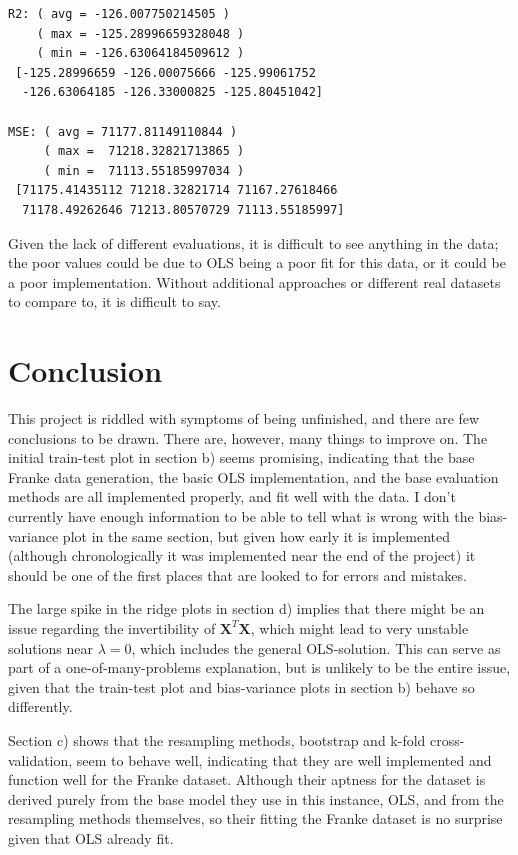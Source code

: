 \documentclass[a4paper, UKenglish]{article}
\newcommand{\0}{\mathbf{0}}
\newcommand{\1}{\mathbf{1}}
\begin{document}
\begin{lstlisting}
R2: ( avg = -126.007750214505 )
    ( max = -125.28996659328048 )
    ( min = -126.63064184509612 )
 [-125.28996659 -126.00075666 -125.99061752 
  -126.63064185 -126.33000825 -125.80451042]

MSE: ( avg = 71177.81149110844 )
     ( max =  71218.32821713865 )
     ( min =  71113.55185997034 )
 [71175.41435112 71218.32821714 71167.27618466 
  71178.49262646 71213.80570729 71113.55185997]
\end{lstlisting}

Given the lack of different evaluations, it is difficult to see anything in the data; the poor values could be due to OLS being a poor fit for this data, or it could be a poor implementation. Without additional approaches or different real datasets to compare to, it is difficult to say.


\section{Conclusion}
This project is riddled with symptoms of being unfinished, and there are few conclusions to be drawn. There are, however, many things to improve on. The initial train-test plot in section b) seems promising, indicating that the base Franke data generation, the basic OLS implementation, and the base evaluation methods are all implemented properly, and fit well with the data. I don't currently have enough information to be able to tell what is wrong with the bias-variance plot in the same section, but given how early it is implemented (although chronologically it was implemented near the end of the project) it should be one of the first places that are looked to for errors and mistakes.

The large spike in the ridge plots in section d) implies that there might be an issue regarding the invertibility of $\textbf{X}^T\textbf{X}$, which might lead to very unstable solutions near $\lambda = 0$, which includes the general OLS-solution. This can serve as part of a one-of-many-problems explanation, but is unlikely to be the entire issue, given that the train-test plot and bias-variance plots in section b) behave so differently.

Section c) shows that the resampling methods, bootstrap and k-fold cross-validation, seem to behave well, indicating that they are well implemented and function well for the Franke dataset. Although their aptness for the dataset is derived purely from the base model they use in this instance, OLS, and from the resampling methods themselves, so their fitting the Franke dataset is no surprise given that OLS already fit.
\end{document}
